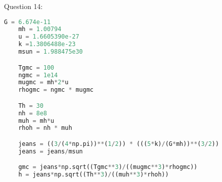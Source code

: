 \documentclass[a4paper]{article}
\begin{document}
Question 14:
\begin{lstlisting}[language=python]
    G = 6.674e-11
    mh = 1.00794
    u = 1.6605390e-27
    k =1.3806488e-23
    msun = 1.988475e30

    Tgmc = 100
    ngmc = 1e14
    mugmc = mh*2*u
    rhogmc = ngmc * mugmc

    Th = 30
    nh = 8e8
    muh = mh*u
    rhoh = nh * muh

    jeans = ((3/(4*np.pi))**(1/2)) * (((5*k)/(G*mh))**(3/2))
    jeans = jeans/msun

    gmc = jeans*np.sqrt((Tgmc**3)/((mugmc**3)*rhogmc))
    h = jeans*np.sqrt((Th**3)/((muh**3)*rhoh))
\end{lstlisting}
\end{document}
